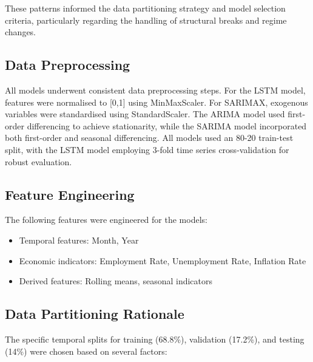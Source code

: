 \documentclass[12pt,a4paper]{report}
\begin{document}
These patterns informed the data partitioning strategy and model selection criteria, particularly regarding the handling of structural breaks and regime changes.

\subsection{Data Preprocessing}
All models underwent consistent data preprocessing steps. For the LSTM model, features were normalised to [0,1] using MinMaxScaler. For SARIMAX, exogenous variables were standardised using StandardScaler. The ARIMA model used first-order differencing to achieve stationarity, while the SARIMA model incorporated both first-order and seasonal differencing. All models used an 80-20 train-test split, with the LSTM model employing 3-fold time series cross-validation for robust evaluation.

\subsection{Feature Engineering}
The following features were engineered for the models:
\begin{itemize}
    \item Temporal features: Month, Year
    \item Economic indicators: Employment Rate, Unemployment Rate, Inflation Rate
    \item Derived features: Rolling means, seasonal indicators
\end{itemize}

\subsection{Data Partitioning Rationale}
The specific temporal splits for training (68.8\%), validation (17.2\%), and testing (14\%) were chosen based on several factors:
\end{document}
